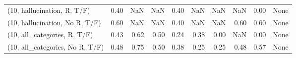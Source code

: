 \begin{table*}[h!]
\begin{adjustbox}{width=2\columnwidth,center}
\begin{tabular}{lrrr|rrr|rrr}
(10, hallucination, R, T/F)           &                      0.40 &                   NaN &                       NaN &                          0.40 &                       NaN &                           NaN &                                    NaN &                               0.00 &                                  None \\
(10, hallucination, No R, T/F)        &                      0.60 &                   NaN &                       NaN &                          0.40 &                       NaN &                           NaN &                                   0.60 &                               0.60 &                                  None \\
(10, all\_categories, R, T/F)          &                      0.43 &                  0.62 &                      0.50 &                          0.24 &                      0.38 &                          0.00 &                                    NaN &                               0.00 &                                  None \\
(10, all\_categories, No R, T/F)       &                      0.48 &                  0.75 &                      0.50 &                          0.38 &                      0.25 &                          0.25 &                                   0.48 &                               0.57 &                                  None \\




\end{tabular}
\end{adjustbox}
\end{table*}
